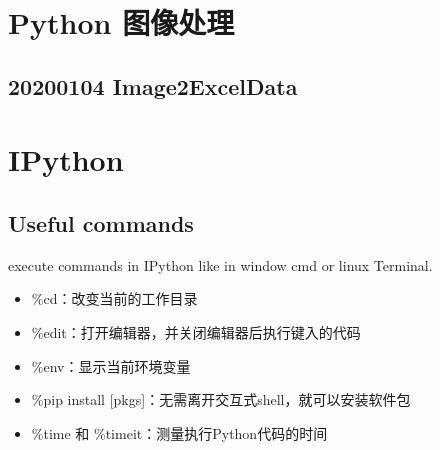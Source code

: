 \documentclass[UTF8,fancyhdr,a4paper]{ctexart}
\begin{document}
\section{Python 图像处理}
\subsection{20200104 Image2ExcelData}

\newpage
\section{IPython}
\subsection{Useful commands}
execute commands in IPython like in window cmd or linux Terminal.
\begin{itemize}
\item
\%cd：改变当前的工作目录
\item
\%edit：打开编辑器，并关闭编辑器后执行键入的代码
\item
\%env：显示当前环境变量
\item
\%pip install [pkgs]：无需离开交互式shell，就可以安装软件包
\item
\%time 和 \%timeit：测量执行Python代码的时间
\end{itemize}
\end{document}
